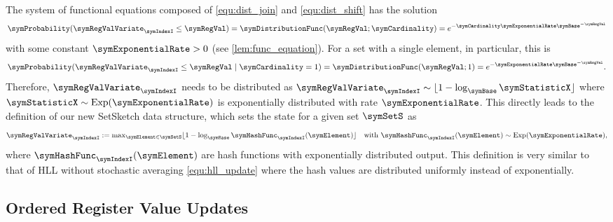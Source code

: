\documentclass[sigconf, nonacm]{acmart}
\newif\ifextended\extendedtrue
\DeclareMathOperator*{\symExponential}{Exp}
\begin{document}
The system of functional equations composed of \eqref{equ:dist_join} and \eqref{equ:dist_shift} has the solution
\begin{equation}
\label{equ:set_sketch_distribution}
\symProbability(\symRegValVariate_\symIndexI \leq \symRegVal) =  \symDistributionFunc(\symRegVal;\symCardinality) = e^{-\symCardinality\symExponentialRate \symBase^{-\symRegVal}}
\end{equation}
with some constant $\symExponentialRate>0$ \ifextended(see \cref{lem:func_equation})\else\cite{Ertl2021}\fi. For a set with a single element, in particular, this is
\begin{equation}
\label{equ:reg_val_distribution}
\symProbability(\symRegValVariate_\symIndexI \leq \symRegVal\mid \symCardinality = 1) =  \symDistributionFunc(\symRegVal;1) = e^{-\symExponentialRate\symBase^{-\symRegVal}}.
\end{equation}
Therefore, $\symRegValVariate_\symIndexI$ needs to be distributed as
$\symRegValVariate_\symIndexI
\sim
\lfloor 1 - \log_\symBase\symStatisticX \rfloor$ where $\symStatisticX\sim\symExponential(\symExponentialRate)$ is exponentially distributed with rate $\symExponentialRate$.
This directly leads to the definition of our new SetSketch data structure, which sets the state for a given set $\symSetS$ as
\begin{equation}
\label{equ:setsketch_update}
\textstyle\symRegValVariate_\symIndexI := \max_{\symElement\in\symSetS} \lfloor 1 - \log_\symBase \symHashFunc_\symIndexI(\symElement)\rfloor\quad\textnormal{with}\ \symHashFunc_\symIndexI(\symElement) \sim \symExponential(\symExponentialRate),
\end{equation}
where $\symHashFunc_\symIndexI(\symElement)$ are hash functions with exponentially distributed output. This definition is very similar to that of \ac{HLL} without stochastic averaging \eqref{equ:hll_update} where the hash values are distributed uniformly instead of exponentially.

\subsection{Ordered Register Value Updates}
\end{document}
